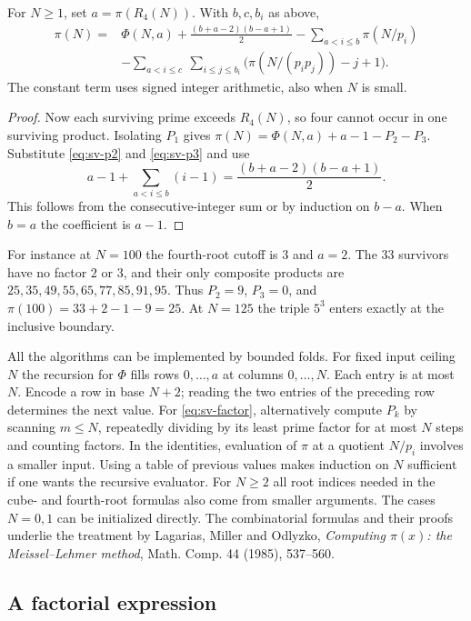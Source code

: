 \begin{proposition}
For $N\ge1$, set $a=\pi(R_4(N))$. With $b,c,b_i$ as above,
\begin{align*}
 \pi(N)={}&\Phi(N,a)+\frac{(b+a-2)(b-a+1)}2
       -\sum_{a<i\le b}\pi(N/p_i)\\
       &-\sum_{a<i\le c}\ \sum_{i\le j\le b_i}
                \big(\pi(N/(p_ip_j))-j+1\big).
\end{align*}
The constant term uses signed integer arithmetic, also when $N$ is small.
\end{proposition}
\begin{proof}
Now each surviving prime exceeds $R_4(N)$, so four cannot occur in one surviving product. Isolating $P_1$ gives $\pi(N)=\Phi(N,a)+a-1-P_2-P_3$. Substitute \eqref{eq:sv-p2} and \eqref{eq:sv-p3} and use
\[
 a-1+\sum_{a<i\le b}(i-1)=\frac{(b+a-2)(b-a+1)}2.
\]
This follows from the consecutive-integer sum or by induction on $b-a$. When $b=a$ the coefficient is $a-1$.
\end{proof}

For instance at $N=100$ the fourth-root cutoff is $3$ and $a=2$. The $33$ survivors have no factor $2$ or $3$, and their only composite products are $25,35,49,55,65,77,85,91,95$. Thus $P_2=9$, $P_3=0$, and $\pi(100)=33+2-1-9=25$. At $N=125$ the triple $5^3$ enters exactly at the inclusive boundary.

All the algorithms can be implemented by bounded folds. For fixed input ceiling $N$ the recursion for $\Phi$ fills rows $0,\ldots,a$ at columns $0,\ldots,N$. Each entry is at most $N$. Encode a row in base $N+2$; reading the two entries of the preceding row determines the next value. For \eqref{eq:sv-factor}, alternatively compute $P_k$ by scanning $m\le N$, repeatedly dividing by its least prime factor for at most $N$ steps and counting factors. In the identities, evaluation of $\pi$ at a quotient $N/p_i$ involves a smaller input. Using a table of previous values makes induction on $N$ sufficient if one wants the recursive evaluator. For $N\ge2$ all root indices needed in the cube- and fourth-root formulas also come from smaller arguments. The cases $N=0,1$ can be initialized directly. The combinatorial formulas and their proofs underlie the treatment by Lagarias, Miller and Odlyzko, \emph{Computing $\pi(x)$: the Meissel--Lehmer method}, Math. Comp. 44 (1985), 537--560.

\subsection{A factorial expression}

